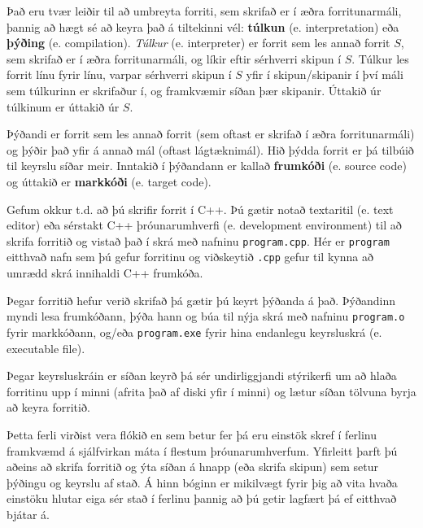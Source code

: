 
Það eru tvær leiðir til að umbreyta forriti, sem skrifað er í æðra forritunarmáli, þannig að hægt sé að keyra það á tiltekinni vél: {\bf túlkun} (e. interpretation) eða {\bf
þýðing} (e. compilation).
{\em Túlkur} (e. interpreter) er forrit sem les annað forrit $S$, sem skrifað er í æðra forritunarmáli, og líkir eftir sérhverri skipun í $S$.
Túlkur les forrit línu fyrir línu, varpar sérhverri skipun í $S$ yfir í skipun/skipanir í því máli sem túlkurinn er skrifaður í, og framkvæmir síðan þær skipanir.
Úttakið úr túlkinum er úttakið úr $S$.

\vspace{0.1in}
\centerline{}
\vspace{0.1in}

Þýðandi er forrit sem les annað forrit (sem oftast er skrifað í æðra forritunarmáli) og þýðir það yfir á annað mál (oftast lágtæknimál).
Hið þýdda forrit er þá tilbúið til keyrslu síðar meir.
Inntakið í þýðandann er kallað {\bf frumkóði} (e. source code) og úttakið er {\bf markkóði} (e. target code).

Gefum okkur t.d. að þú skrifir forrit í C++.
Þú gætir notað textaritil (e. text editor) eða sérstakt C++ þróunarumhverfi (e. development environment) til að skrifa forritið og vistað það í skrá með nafninu {\tt program.cpp}.
Hér er {\tt program} eitthvað nafn sem þú gefur forritinu og viðskeytið {\tt .cpp} gefur til kynna að umrædd skrá innihaldi C++ frumkóða.

Þegar forritið hefur verið skrifað þá gætir þú keyrt þýðanda á það.
Þýðandinn myndi lesa frumkóðann, þýða hann og búa til nýja skrá með nafninu {\tt program.o} fyrir markkóðann,
og/eða {\tt program.exe} fyrir hina endanlegu keyrsluskrá (e. executable file).

\vspace{0.1in}
\centerline{}
\vspace{0.1in}

Þegar keyrsluskráin er síðan keyrð þá sér undirliggjandi stýrikerfi um að hlaða forritinu upp í minni (afrita það af diski yfir í minni) og lætur síðan tölvuna byrja að keyra forritið.

Þetta ferli virðist vera flókið en sem betur fer þá eru einstök skref í ferlinu framkvæmd á sjálfvirkan máta í flestum þróunarumhverfum.
Yfirleitt þarft þú aðeins að skrifa forritið og ýta síðan á hnapp (eða skrifa skipun) sem setur þýðingu og keyrslu af stað.
Á hinn bóginn er mikilvægt fyrir þig að vita hvaða einstöku hlutar eiga sér stað í ferlinu þannig að þú getir lagfært þá ef eitthvað bjátar á. 


